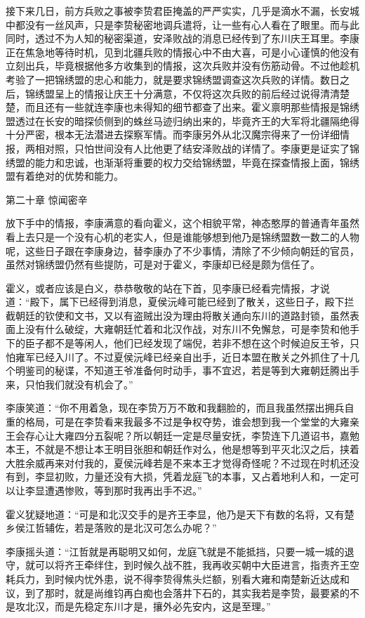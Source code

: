 接下来几日，前方兵败之事被李贽君臣掩盖的严严实实，几乎是滴水不漏，长安城中都没有一丝风声，只是李贽秘密地调兵遣将，让一些有心人看在了眼里。而与此同时，透过不为人知的秘密渠道，安泽败战的消息已经传到了东川庆王耳里。李康正在焦急地等待时机，见到北疆兵败的情报心中不由大喜，可是小心谨慎的他没有立刻出兵，毕竟根据他多方收集到的情报，这次兵败并没有伤筋动骨。不过他趁机考验了一把锦绣盟的忠心和能力，就是要求锦绣盟调查这次兵败的详情。数日之后，锦绣盟呈上的情报让庆王十分满意，不仅将这次兵败的前后经过说得清清楚楚，而且还有一些就连李康也未得知的细节都查了出来。霍义禀明那些情报是锦绣盟透过在长安的暗探侦侧到的蛛丝马迹归纳出来的，毕竟齐王的大军将北疆隔绝得十分严密，根本无法潜进去探察军情。而李康另外从北汉魔宗得来了一份详细情报，两相对照，只怕世间没有人比他更了结安泽败战的详情了。李康更是证实了锦绣盟的能力和忠诚，也渐渐将重要的权力交给锦绣盟，毕竟在探查情报上面，锦绣盟有着绝对的优势和能力。

第二十章    惊闻密辛

放下手中的情报，李康满意的看向霍义，这个相貌平常，神态憨厚的普通青年虽然看上去只是一个没有心机的老实人，但是谁能够想到他乃是锦绣盟数一数二的人物呢，这些日子跟在李康身边，替李康办了不少事情，清除了不少倾向朝廷的官员，虽然对锦绣盟仍然有些提防，可是对于霍义，李康却已经是颇为信任了。

霍义，或者应该是白义，恭恭敬敬的站在下首，见李康已经看完情报，才说道：“殿下，属下已经得到消息，夏侯沅峰可能已经到了散关，这些日子，殿下拦截朝廷的钦使和文书，又以有盗贼出没为理由将散关通向东川的道路封锁，虽然表面上没有什么破绽，大雍朝廷忙着和北汉作战，对东川不免懈怠，可是李贽和他手下的臣子都不是等闲人，他们已经发现了端倪，若非不想在这个时候迫反王爷，只怕雍军已经入川了。不过夏侯沅峰已经亲自出手，近日本盟在散关之外抓住了十几个明鉴司的秘谍，不知道王爷准备何时动手，事不宜迟，若是等到大雍朝廷腾出手来，只怕我们就没有机会了。”

李康笑道：“你不用着急，现在李贽万万不敢和我翻脸的，而且我虽然摆出拥兵自重的格局，可是在李贽看来我最多不过是争权夺势，谁会想到我一个堂堂的大雍亲王会存心让大雍四分五裂呢？所以朝廷一定是尽量安抚，李贽连下几道诏书，嘉勉本王，不就是不想让本王明目张胆和朝廷作对么，他是想等到平灭北汉之后，挟着大胜余威再来对付我的，夏侯沅峰若是不来本王才觉得奇怪呢？不过现在时机还没有到，李显初败，力量还没有大损，凭着龙庭飞的本事，又占着地利人和，一定可以让李显遭遇惨败，等到那时我再出手不迟。”

霍义犹疑地道：“可是和北汉交手的是齐王李显，他乃是天下有数的名将，又有楚乡侯江哲辅佐，若是落败的是北汉可怎么办呢？”

李康摇头道：“江哲就是再聪明又如何，龙庭飞就是不能抵挡，只要一城一城的退守，就可以将齐王牵绊住，到时候久战不胜，我再收买朝中大臣进言，指责齐王空耗兵力，到时候内忧外患，说不得李贽得焦头烂额，别看大雍和南楚新近达成和议，到了那时，就是尚维钧再白痴也会落井下石的，其实我若是李贽，最要紧的不是攻北汉，而是先稳定东川才是，攘外必先安内，这是至理。”

